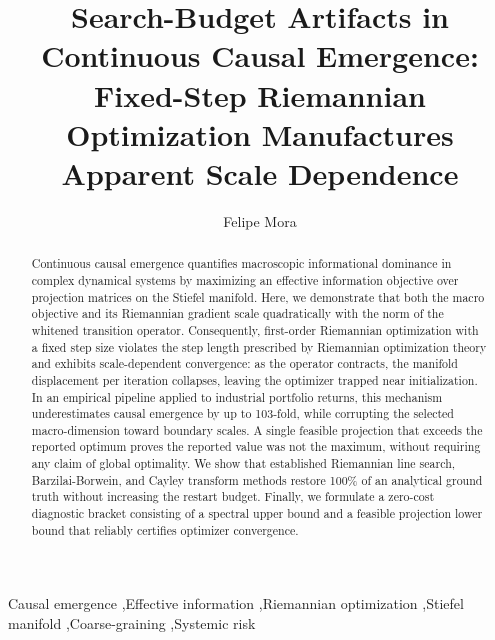 \documentclass[preprint,12pt]{elsarticle}
\begin{document}
\begin{frontmatter}

\title{Search-Budget Artifacts in Continuous Causal Emergence: Fixed-Step Riemannian Optimization Manufactures Apparent Scale Dependence}

\author[usm,uvm]{Felipe Mora}



\begin{abstract}
Continuous causal emergence quantifies macroscopic informational dominance in complex dynamical systems by maximizing an effective information objective over projection matrices on the Stiefel manifold. Here, we demonstrate that both the macro objective and its Riemannian gradient scale quadratically with the norm of the whitened transition operator. Consequently, first-order Riemannian optimization with a fixed step size violates the step length prescribed by Riemannian optimization theory and exhibits scale-dependent convergence: as the operator contracts, the manifold displacement per iteration collapses, leaving the optimizer trapped near initialization. In an empirical pipeline applied to industrial portfolio returns, this mechanism underestimates causal emergence by up to 103-fold, while corrupting the selected macro-dimension toward boundary scales. A single feasible projection that exceeds the reported optimum proves the reported value was not the maximum, without requiring any claim of global optimality. We show that established Riemannian line search, Barzilai-Borwein, and Cayley transform methods restore 100\% of an analytical ground truth without increasing the restart budget. Finally, we formulate a zero-cost diagnostic bracket consisting of a spectral upper bound and a feasible projection lower bound that reliably certifies optimizer convergence.
\end{abstract}

\begin{keyword}
Causal emergence \sep Effective information \sep Riemannian optimization \sep Stiefel manifold \sep Coarse-graining \sep Systemic risk
\end{keyword}

\end{frontmatter}
\end{document}
